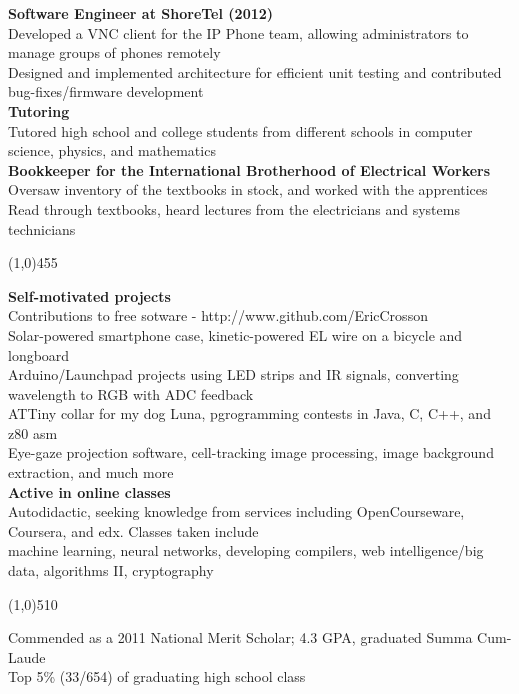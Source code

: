 \documentclass{report}
\newcommand{\cut}{\begin{center} \line(1,0){510} \end{center}}
\begin{document}
\textbf{Software Engineer at ShoreTel (2012)} \\
Developed a VNC client for the IP Phone team, allowing
administrators to manage groups of phones remotely \\
Designed and implemented architecture for efficient unit testing and
contributed bug-fixes/firmware development \\

\textbf{Tutoring} \\
Tutored high school and college students from different schools in
computer science, physics, and mathematics \\

\textbf{Bookkeeper for the International Brotherhood of Electrical Workers} \\
Oversaw inventory of the textbooks in stock, and worked with the
apprentices \\
Read through textbooks, heard lectures from the electricians and
systems technicians

\line(1,0){455}


\textbf{Self-motivated projects} \\
Contributions to free sotware - http://www.github.com/EricCrosson \\
Solar-powered smartphone case, kinetic-powered EL wire on a bicycle
and longboard \\
Arduino/Launchpad projects using LED strips and IR signals, converting
wavelength to RGB with ADC feedback \\
ATTiny collar for my dog Luna, pgrogramming contests in Java, C, C++,
and z80 asm \\
Eye-gaze projection software, cell-tracking image processing, image
background extraction, and much more \\

\textbf{Active in online classes} \\
Autodidactic, seeking knowledge from services including
OpenCourseware, Coursera, and edx. Classes taken include \\
machine learning, neural networks, developing compilers, web
intelligence/big data, algorithms II, cryptography

\cut{}

Commended as a 2011 National Merit Scholar; 4.3 GPA, graduated Summa Cum-Laude \\
Top 5\% (33/654) of graduating high school class
\end{document}
